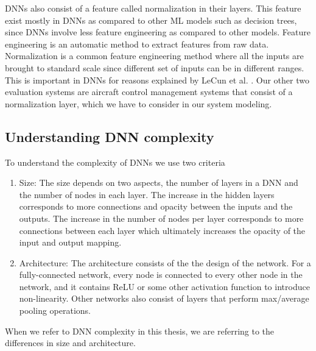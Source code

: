 \ac{DNN}s also consist of a feature called normalization in their layers. 
This feature exist mostly in \ac{DNN}s as compared to other \ac{ML} models such as decision trees, since \ac{DNN}s involve less feature engineering as compared to other models. 
Feature engineering is an automatic method to extract features from raw data. 
Normalization is a common feature engineering method where all the inputs are brought to standard scale since different set of inputs can be in different ranges. 
This is important in \ac{DNN}s for reasons explained by  LeCun et al.  \cite{10.5555/645754.668382}.
Our other two evaluation systems are aircraft  control management systems \cite{10.1007/978-3-319-63387-9_5} that consist of a normalization layer, 
which we have to consider in our system modeling. 
\subsection{Understanding DNN complexity}
\label{dnncomplexity}
To understand the complexity of \ac{DNN}s we use two criteria
\begin{enumerate}
	\item Size: The size depends on two aspects, the number of layers in a \ac{DNN} and the number of nodes in each layer. 
    The increase in the hidden layers corresponds to more connections and opacity between the inputs and the outputs. 
    The increase in the number of nodes per layer corresponds to more connections between each layer which ultimately increases the opacity of the input and output mapping. 
	\item Architecture: The architecture consists of the the design of the network. 
	For a fully-connected network, every node is connected to every other node in the network, and it contains ReLU or some other activation function to introduce non-linearity.
	Other networks also consist of layers that perform max/average pooling operations. 
	
\end{enumerate}
When we refer to \ac{DNN} complexity in this thesis, we are referring to the differences in size and architecture.


